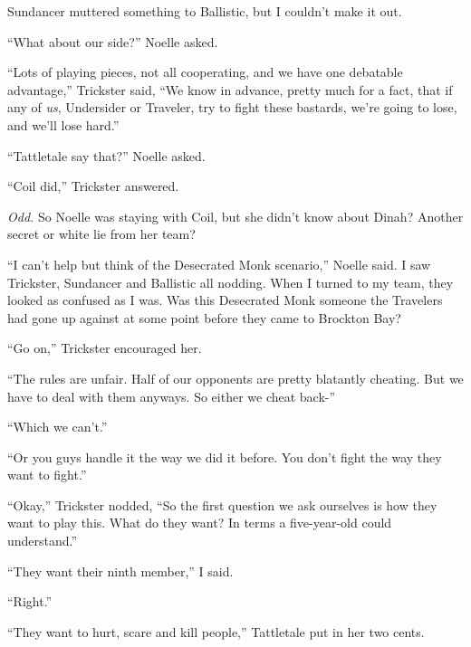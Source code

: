 Sundancer muttered something to Ballistic, but I couldn't make it out.



``What about our side?'' Noelle asked.



``Lots of playing pieces, not all cooperating, and we have one debatable advantage,'' Trickster said, ``We know in advance, pretty much for a fact, that if any of \emph{us}, Undersider or Traveler, try to fight these bastards, we're going to lose, and we'll lose hard.''



``Tattletale say that?'' Noelle asked.



``Coil did,'' Trickster answered.



\emph{Odd.}  So Noelle was staying with Coil, but she didn't know about Dinah?  Another secret or white lie from her team?



``I can't help but think of the Desecrated Monk scenario,'' Noelle said.  I saw Trickster, Sundancer and Ballistic all nodding.  When I turned to my team, they looked as confused as I was.  Was this Desecrated Monk someone the Travelers had gone up against at some point before they came to Brockton Bay?



``Go on,'' Trickster encouraged her.



``The rules are unfair.  Half of our opponents are pretty blatantly cheating.  But we have to deal with them anyways.  So either we cheat back-''



``Which we can't.''



``Or you guys handle it the way we did it before.  You don't fight the way they want to fight.''



``Okay,'' Trickster nodded, ``So the first question we ask ourselves is how they want to play this.  What do they want?  In terms a five-year-old could understand.''



``They want their ninth member,'' I said.



``Right.''



``They want to hurt, scare and kill people,'' Tattletale put in her two cents.



